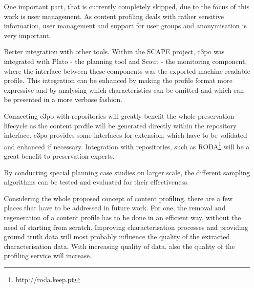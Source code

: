One important part, that is currently completely skipped, due to the focus of this work is user management. As content profiling deals with rather sensitive information, user management and support for user groups and anonymisation is very important.

Better integration with other tools. Within the SCAPE project, c3po was integrated with Plato - the planning tool and Scout - the monitoring component, where the interface between these components was the exported machine readable profile. This integration can be enhanced by making the profile format more expressive and by analysing which characteristics can be omitted and which can be presented in a more verbose fashion.

Connecting c3po with repositories will greatly benefit the whole preservation lifecycle as the content profile will be generated directly within the repository interface. c3po provides some interfaces for extension, which have to be validated and enhanced if necessary. Integration with repositories, such as RODA\footnote{http://roda.keep.pt} will be a great benefit to preservation experts.

By conducting special planning case studies on larger scale, the different sampling algorithms can be tested and evaluated for their effectiveness.

Considering the whole proposed concept of content profiling, there are a few places that have to be addressed in future work. For one, the removal and regeneration of a content profile has to be done in an efficient way, without the need of starting from scratch. Improving characterisation processes and providing ground truth data will most probably influence the quality of the extracted characterisation data. With increasing quality of data, also the quality of the profiling service will increase.
